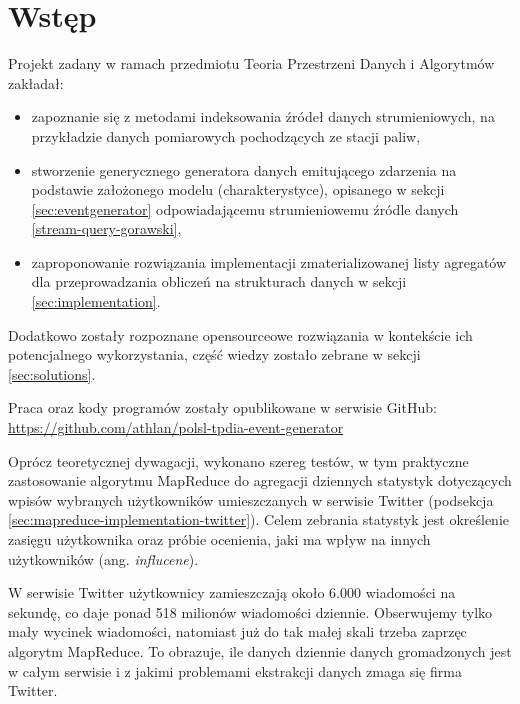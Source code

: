 \section{Wstęp}
\label{sec:intro}

Projekt zadany w ramach przedmiotu Teoria Przestrzeni Danych i Algorytmów zakładał:

\begin{itemize}[noitemsep]
  \item zapoznanie się z metodami indeksowania źródeł danych strumieniowych, na przykładzie danych pomiarowych pochodzących ze stacji paliw,
  \item stworzenie generycznego generatora danych emitującego zdarzenia na podstawie założonego modelu (charakterystyce), opisanego w sekcji \ref{sec:eventgenerator} odpowiadającemu strumieniowemu źródle danych \ref{stream-query-gorawski},
  \item zaproponowanie rozwiązania implementacji zmaterializowanej listy agregatów dla przeprowadzania obliczeń na strukturach danych w sekcji \ref{sec:implementation}.
\end{itemize}

Dodatkowo zostały rozpoznane opensourceowe rozwiązania w kontekście ich potencjalnego wykorzystania, część wiedzy zostało zebrane w sekcji \ref{sec:solutions}.

Praca oraz kody programów zostały opublikowane w serwisie GitHub:\\
\url{https://github.com/athlan/polsl-tpdia-event-generator}

Oprócz teoretycznej dywagacji, wykonano szereg testów, w tym praktyczne zastosowanie algorytmu MapReduce do agregacji dziennych statystyk dotyczących wpisów wybranych użytkowników umieszczanych w serwisie Twitter (podsekcja \ref{sec:mapreduce-implementation-twitter}). Celem zebrania statystyk jest określenie zasięgu użytkownika oraz próbie ocenienia, jaki ma wpływ na innych użytkowników (ang. \emph{influcene}).

W serwisie Twitter użytkownicy zamieszczają około 6.000 wiadomości na sekundę, co daje ponad 518 milionów wiadomości dziennie. Obserwujemy tylko mały wycinek wiadomości, natomiast już do tak małej skali trzeba zaprzęc algorytm MapReduce. To obrazuje, ile danych dziennie danych gromadzonych jest w całym serwisie i z jakimi problemami ekstrakcji danych zmaga się firma Twitter.

